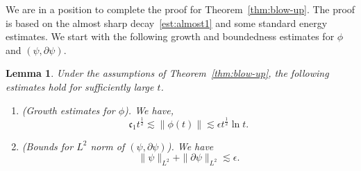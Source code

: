 \documentclass[a4paper,reqno]{amsart}
\newtheorem{lemma}[theorem]{Lemma}
\theoremstyle{definition}
\numberwithin{equation}{section}
\begin{document}
We are in a position to complete the proof for Theorem~\ref{thm:blow-up}. The proof is based on the almost sharp decay~\eqref{est:almost1} and some standard energy estimates. We start with the following growth and boundedness estimates for  $\phi$ and $(\psi,\partial \psi)$.
\begin{lemma}
\label{lem:growthofL2ofphi}
   Under the assumptions of Theorem~\ref{thm:blow-up}, the following estimates hold for sufficiently large $t$.
   \begin{enumerate}
       \item \emph{(Growth estimates for $\phi$).} We have, 
    \begin{equation*}
        \mathfrak{c}_{1} t^{\frac{1}{2}}\lesssim \|\phi(t)\|\lesssim \epsilon t^{\frac{1}{2}}\ln t.
    \end{equation*}

    \item \emph{(Bounds for $L^{2}$ norm of $(\psi,\partial\psi)$).} We have 
    \begin{equation*}
        \|\psi\|_{L^{2}}+\|\partial \psi\|_{L^{2}}\lesssim \epsilon.
    \end{equation*}
    \end{enumerate}
\end{lemma}
\end{document}
